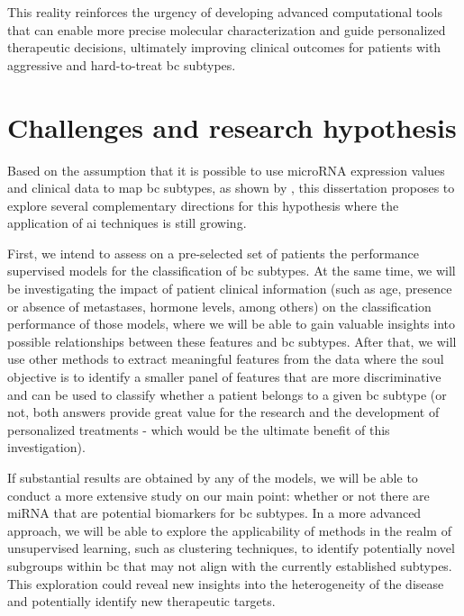 This reality reinforces the urgency of developing advanced computational tools
that can enable more precise molecular characterization and guide personalized
therapeutic decisions, ultimately improving clinical outcomes for patients with
aggressive and hard-to-treat \gls{bc} subtypes.

\section{Challenges and research hypothesis}
\label{sec:challenges+research-hypothesis}
Based on the assumption that it is possible to use microRNA expression values
and clinical data to map \gls{bc} subtypes, as shown by
\textcite{mirnas_in_bc_Muñoz2023}, this dissertation
proposes to explore several complementary directions for this hypothesis where
the application of \gls{ai} techniques is still growing.

First, we intend to assess on a pre-selected set of patients the performance supervised models for the classification 
of \gls{bc} subtypes. At the same time, we will be
investigating the impact of patient clinical information (such as age, presence
or absence of metastases, hormone levels, among others) on the classification
performance of those models, where we will be able to gain valuable insights into
possible relationships between these features and \gls{bc} subtypes. After that, 
we will use other methods to extract meaningful features from the data
where the soul objective is to identify a smaller panel of features that are more 
discriminative and can be used to classify whether a patient belongs to a given 
\gls{bc} subtype (or not, both answers provide great value for the research 
and the development of personalized treatments - which would be the ultimate benefit 
of this investigation).

If substantial results are obtained by any of the models, we will be able to
conduct a more extensive study on our main point: whether or not there are
miRNA that are potential biomarkers for \gls{bc} subtypes. In a more
advanced approach, we will be able to explore the applicability of methods in
the realm of unsupervised learning, such as clustering techniques, to identify
potentially novel subgroups within \gls{bc} that may not align with the
currently established subtypes. This exploration could reveal new insights into
the heterogeneity of the disease and potentially identify new therapeutic
targets.

